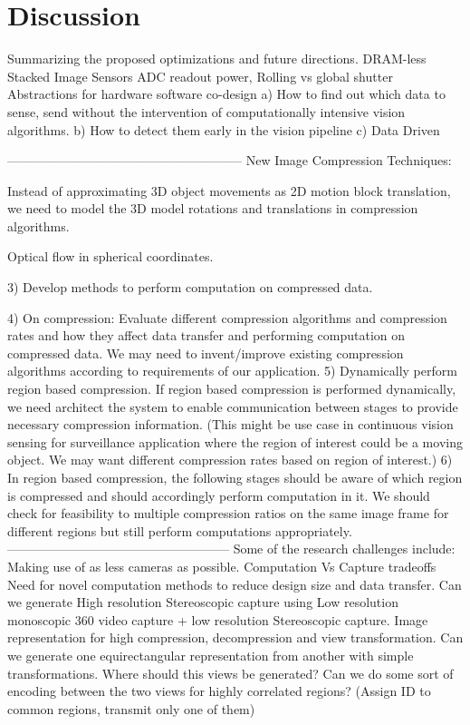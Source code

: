 \chapter{Discussion}
Summarizing the proposed optimizations and future directions.
DRAM-less
Stacked Image Sensors
ADC readout power, Rolling vs global shutter
Abstractions for hardware software co-design
a) How to find out which data to sense, send without the intervention of computationally intensive vision algorithms.
b) How to detect them early in the vision pipeline
c) Data Driven 

--------------------------------------------------------
    New Image Compression Techniques:​

Instead of approximating 3D object movements as 2D motion block translation, we need to model the 3D model rotations and translations in compression algorithms.

Optical flow in spherical coordinates.
	
3) 
Develop methods to perform computation on compressed data.


4)
On compression: 
Evaluate different compression algorithms and compression rates and how they affect data transfer and performing computation on compressed data. We may need to invent/improve existing compression algorithms according to requirements of our application.
5) 
Dynamically perform region based compression. If region based compression is performed dynamically, we need architect the system to enable communication between stages to provide necessary compression information. (This might be use case in continuous vision sensing for surveillance application where the region of interest could be a moving object. We may want different compression rates based on region of interest.) 
6)
In region based compression, the following stages should be aware of which region is compressed and should accordingly​ perform computation in it. We should check for feasibility  to multiple compression ratios on the same image frame for different regions but still perform computations appropriately. 
-----------------------------------------------------
Some of the research challenges include:
Making use of as less cameras as possible.
Computation Vs Capture tradeoffs
Need for novel computation methods to reduce design size and data transfer.
Can we generate High resolution Stereoscopic capture using Low resolution monoscopic 360 video capture + low resolution Stereoscopic capture.
Image representation for high compression, decompression and view transformation.
Can we generate one equirectangular representation from another with simple transformations. 
Where should this views be generated?
Can we do some sort of encoding between the two views for highly correlated regions? (Assign ID to common regions, transmit only one of them)


